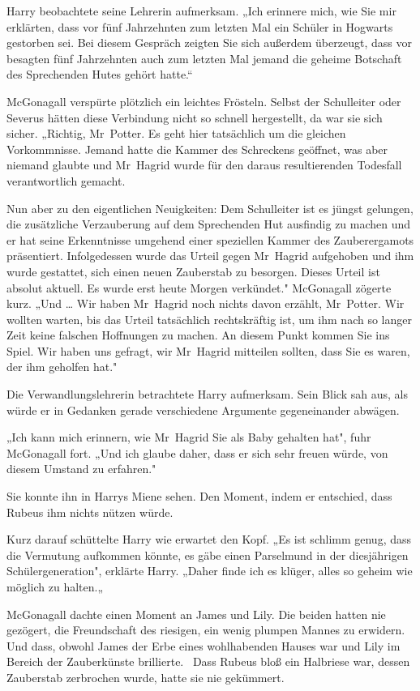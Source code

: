 {Harry beobachtete seine Lehrerin aufmerksam. „Ich erinnere mich, wie Sie mir erklärten, dass vor fünf Jahrzehnten zum letzten Mal ein Schüler in Hogwarts gestorben sei. Bei diesem Gespräch zeigten Sie sich außerdem überzeugt, dass vor besagten fünf Jahrzehnten auch zum letzten Mal jemand die geheime Botschaft des Sprechenden Hutes gehört hatte.“

McGonagall verspürte plötzlich ein leichtes Frösteln. Selbst der Schulleiter oder Severus hätten diese Verbindung nicht so schnell hergestellt, da war sie sich sicher. „Richtig, Mr~Potter. Es geht hier tatsächlich um die gleichen Vorkommnisse. Jemand hatte die Kammer des Schreckens geöffnet, was aber niemand glaubte und Mr~Hagrid wurde für den daraus resultierenden Todesfall verantwortlich gemacht.

Nun aber zu den eigentlichen Neuigkeiten: Dem Schulleiter ist es jüngst gelungen, die zusätzliche Verzauberung auf dem Sprechenden Hut ausfindig zu machen und er hat seine Erkenntnisse umgehend einer speziellen Kammer des Zauberergamots präsentiert. Infolgedessen wurde das Urteil gegen Mr~Hagrid aufgehoben und ihm wurde gestattet, sich einen neuen Zauberstab zu besorgen. Dieses Urteil ist absolut aktuell. Es wurde erst heute Morgen verkündet." McGonagall zögerte kurz. „Und … Wir haben Mr~Hagrid noch nichts davon erzählt, Mr~Potter. Wir wollten warten, bis das Urteil tatsächlich rechtskräftig ist, um ihm nach so langer Zeit keine falschen Hoffnungen zu machen. An diesem Punkt kommen Sie ins Spiel. Wir haben uns gefragt, wir Mr~Hagrid mitteilen sollten, dass Sie es waren, der ihm geholfen hat."

Die Verwandlungslehrerin betrachtete Harry aufmerksam. Sein Blick sah aus, als würde er in Gedanken gerade verschiedene Argumente gegeneinander abwägen.

„Ich kann mich erinnern, wie Mr~Hagrid Sie als Baby gehalten hat", fuhr McGonagall fort. „Und ich glaube daher, dass er sich sehr freuen würde, von diesem Umstand zu erfahren."

Sie konnte ihn in Harrys Miene sehen. Den Moment, indem er entschied, dass Rubeus ihm nichts nützen würde.

Kurz darauf schüttelte Harry wie erwartet den Kopf. „Es ist schlimm genug, dass die Vermutung aufkommen könnte, es gäbe einen Parselmund in der diesjährigen Schülergeneration", erklärte Harry. „Daher finde ich es klüger, alles so geheim wie möglich zu halten.„

McGonagall dachte einen Moment an James und Lily. Die beiden hatten nie gezögert, die Freundschaft des riesigen, ein wenig plumpen Mannes zu erwidern. Und dass, obwohl James der Erbe eines wohlhabenden Hauses war und Lily im Bereich der Zauberkünste brillierte. ~Dass Rubeus bloß ein Halbriese war, dessen Zauberstab zerbrochen wurde, hatte sie nie gekümmert.

}

